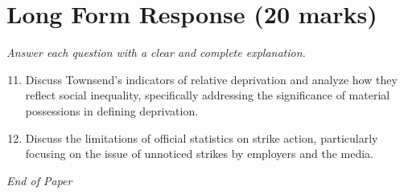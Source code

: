 \documentclass[12pt]{article}
\begin{document}
\section*{Long Form Response (20 marks)}
\textit{Answer each question with a clear and complete explanation.}
\begin{enumerate}[label=\arabic*.]
\setcounter{enumi}{10}
\item Discuss Townsend's indicators of relative deprivation and analyze how they reflect social inequality, specifically addressing the significance of material possessions in defining deprivation.
\item Discuss the limitations of official statistics on strike action, particularly focusing on the issue of unnoticed strikes by employers and the media.
\end{enumerate}

\vfill
\noindent\textit{End of Paper}
\end{document}
